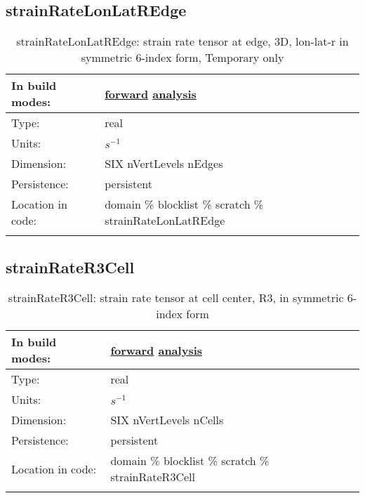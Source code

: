 \subsection[strainRateLonLatREdge]{strainRateLonLatREdge}
\label{subsec:var_sec_scratch_strainRateLonLatREdge}
\begin{center}
\begin{longtable}{| p{2.0in} | p{4.0in} |}
        \hline 
        In build modes: & \hyperref[subsec:forward_var_tab_scratch]{forward} \hyperref[subsec:analysis_var_tab_scratch]{analysis} \\
        \hline 
        Type: & real \\
        \hline 
        Units: & $s^{-1}$ \\
        \hline 
        Dimension: & SIX nVertLevels nEdges \\
        \hline 
        Persistence: & persistent \\
        \hline 
		 Location in code: & domain \% blocklist \% scratch \% strainRateLonLatREdge \\
		 \hline 
    \caption{strainRateLonLatREdge: strain rate tensor at edge, 3D, lon-lat-r in symmetric 6-index form, {\color{red}Temporary only}}
\end{longtable}
\end{center}
\subsection[strainRateR3Cell]{strainRateR3Cell}
\label{subsec:var_sec_scratch_strainRateR3Cell}
\begin{center}
\begin{longtable}{| p{2.0in} | p{4.0in} |}
        \hline 
        In build modes: & \hyperref[subsec:forward_var_tab_scratch]{forward} \hyperref[subsec:analysis_var_tab_scratch]{analysis} \\
        \hline 
        Type: & real \\
        \hline 
        Units: & $s^{-1}$ \\
        \hline 
        Dimension: & SIX nVertLevels nCells \\
        \hline 
        Persistence: & persistent \\
        \hline 
		 Location in code: & domain \% blocklist \% scratch \% strainRateR3Cell \\
		 \hline 
    \caption{strainRateR3Cell: strain rate tensor at cell center, R3, in symmetric 6-index form}
\end{longtable}
\end{center}
